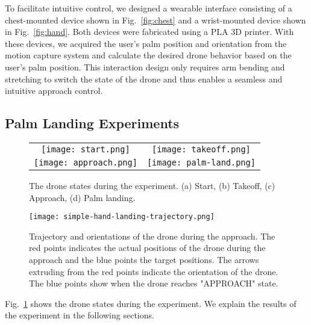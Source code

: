 To facilitate intuitive control, we designed a wearable interface consisting of 
a chest-mounted device shown in Fig.~\ref{fig:chest} and 
a wrist-mounted device shown in Fig.~\ref{fig:hand}.
Both devices were fabricated using a PLA 3D printer. 
With these devices, we acquired the user's palm position and orientation from the motion capture system and calculate the desired drone behavior based on the user's palm position. 
This interaction design only requires arm bending and stretching to switch the state of the drone and thus enables a seamless and intuitive approach control.
\subsection{Palm Landing Experiments}
\begin{figure}[b]
    \begin{tabular}{cc}
      \centering
      \begin{minipage}[t]{0.45 \columnwidth}
        \centering
        \texttt{[image: start.png]}
        \subcaption{}
        \label{fig:start}
      \end{minipage}&
      \begin{minipage}[t]{0.45 \columnwidth}
        \centering
        \texttt{[image: takeoff.png]}
        \subcaption{}
        \label{fig:takeoff}
      \end{minipage} \\
      \begin{minipage}[t]{0.45 \columnwidth}
        \centering
        \texttt{[image: approach.png]}
        \subcaption{}
        \label{fig:approach}
      \end{minipage}&
      \begin{minipage}[t]{0.45 \columnwidth}
        \centering
        \texttt{[image: palm-land.png]}
        \subcaption{}
        \label{fig:palm-land}
      \end{minipage}      
    \end{tabular}
    \caption{The drone states during the experiment. (a) Start, (b) Takeoff, (c) Approach, (d) Palm landing.}
    \label{fig:states}
\end{figure}
\begin{figure}[t]
  \centering
  \texttt{[image: simple-hand-landing-trajectory.png]}
  \caption{Trajectory and orientations of the drone during the approach.
  The red points indicates the actual positions of the drone during the approach and the blue points the target positions. 
  The arrows extruding from the red points indicate the orientation of the drone.
  The blue points show when the drone reaches "APPROACH" state.}
  \label{fig:simple_hand_landing_trajectory}
\end{figure}
Fig.~\ref{fig:states} shows the drone states during the experiment.
We explain the results of the experiment in the following sections.

